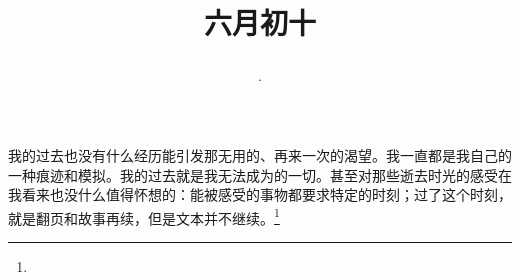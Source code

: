 \title{\date[d=15,m=7,y=2024][year:cn-y,年,month:cn,day:cn,日,·,weekday]·六月初十 }
我的过去也没有什么经历能引发那无用的、再来一次的渴望。我一直都是我自己的一种痕迹和模拟。我的过去就是我无法成为的一切。甚至对那些逝去时光的感受在我看来也没什么值得怀想的：能被感受的事物都要求特定的时刻；过了这个时刻，就是翻页和故事再续，但是文本并不继续。\footnote{ }


